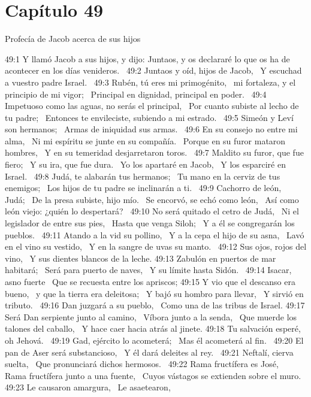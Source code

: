 \section*{Capítulo 49 }
Profecía de Jacob acerca de sus hijos  

49:1 Y llamó Jacob a sus hijos, y dijo: Juntaos, y os declararé lo que os ha de acontecer en los días venideros.  
49:2 Juntaos y oíd, hijos de Jacob,  
Y escuchad a vuestro padre Israel.  
49:3 Rubén, tú eres mi primogénito,  
mi fortaleza, y el principio de mi vigor;  
Principal en dignidad, principal en poder.  
49:4 Impetuoso como las aguas, no serás el principal,  
Por cuanto subiste al lecho de tu padre;  
Entonces te envileciste, subiendo a mi estrado.  
49:5 Simeón y Leví son hermanos;  
Armas de iniquidad sus armas.  
49:6 En su consejo no entre mi alma,  
Ni mi espíritu se junte en su compañía.  
Porque en su furor mataron hombres,  
Y en su temeridad desjarretaron toros.  
49:7 Maldito su furor, que fue fiero;  
Y su ira, que fue dura.  
Yo los apartaré en Jacob,  
Y los esparciré en Israel.  
49:8 Judá, te alabarán tus hermanos;  
Tu mano en la cerviz de tus enemigos;  
Los hijos de tu padre se inclinarán a ti.  
49:9 Cachorro de león, Judá;  
De la presa subiste, hijo mío.  
Se encorvó, se echó como león,  
Así como león viejo: ¿quién lo despertará?  
49:10 No será quitado el cetro de Judá,  
Ni el legislador de entre sus pies,  
Hasta que venga Siloh;  
Y a él se congregarán los pueblos.  
49:11 Atando a la vid su pollino,  
Y a la cepa el hijo de su asna,  
Lavó en el vino su vestido,  
Y en la sangre de uvas su manto.  
49:12 Sus ojos, rojos del vino,  
Y sus dientes blancos de la leche. 
49:13 Zabulón en puertos de mar habitará;  
Será para puerto de naves,  
Y su límite hasta Sidón.  
49:14 Isacar, asno fuerte  
Que se recuesta entre los apriscos; 
49:15 Y vio que el descanso era bueno,  
y que la tierra era deleitosa;  
Y bajó su hombro para llevar,  
Y sirvió en tributo.  
49:16 Dan juzgará a su pueblo,  
Como una de las tribus de Israel. 
49:17 Será Dan serpiente junto al camino,  
Víbora junto a la senda,  
Que muerde los talones del caballo,  
Y hace caer hacia atrás al jinete. 
49:18 Tu salvación esperé, oh Jehová.  
49:19 Gad, ejército lo acometerá;  
Mas él acometerá al fin.  
49:20 El pan de Aser será substancioso,  
Y él dará deleites al rey.  
49:21 Neftalí, cierva suelta,  
Que pronunciará dichos hermosos.  
49:22 Rama fructífera es José,  
Rama fructífera junto a una fuente,  
Cuyos vástagos se extienden sobre el muro. 
49:23 Le causaron amargura,  
Le asaetearon,  
